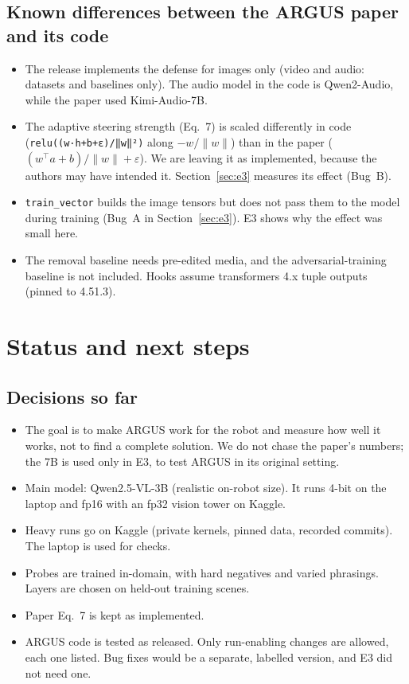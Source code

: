 \documentclass[11pt,a4paper]{article}
\newcommand{\code}[1]{\texttt{#1}}
\begin{document}
\subsection{Known differences between the ARGUS paper and its code}
\begin{itemize}
\item The release implements the defense for images only (video and audio: datasets and baselines only). The audio model in the code is Qwen2-Audio, while the paper used Kimi-Audio-7B.
\item The adaptive steering strength (Eq.~7) is scaled differently in code (\code{relu((w·h+b+ε)/‖w‖²)} along $-w/\lVert w\rVert$) than in the paper ($(w^\top a+b)/\lVert w\rVert+\varepsilon$). We are leaving it as implemented, because the authors may have intended it. Section~\ref{sec:e3} measures its effect (Bug~B).
\item \code{train\_vector} builds the image tensors but does not pass them to the model during training (Bug~A in Section~\ref{sec:e3}). E3 shows why the effect was small here.
\item The removal baseline needs pre-edited media, and the adversarial-training baseline is not included. Hooks assume transformers 4.x tuple outputs (pinned to 4.51.3).
\end{itemize}

\section{Status and next steps}
\label{sec:next}
\subsection{Decisions so far}
\begin{itemize}
\item The goal is to make ARGUS work for the robot and measure how well it works, not to find a complete solution. We do not chase the paper's numbers; the 7B is used only in E3, to test ARGUS in its original setting.
\item Main model: Qwen2.5-VL-3B (realistic on-robot size). It runs 4-bit on the laptop and fp16 with an fp32 vision tower on Kaggle.
\item Heavy runs go on Kaggle (private kernels, pinned data, recorded commits). The laptop is used for checks.
\item Probes are trained in-domain, with hard negatives and varied phrasings. Layers are chosen on held-out training scenes.
\item Paper Eq.~7 is kept as implemented.
\item ARGUS code is tested as released. Only run-enabling changes are allowed, each one listed. Bug fixes would be a separate, labelled version, and E3 did not need one.
\end{itemize}
\end{document}

